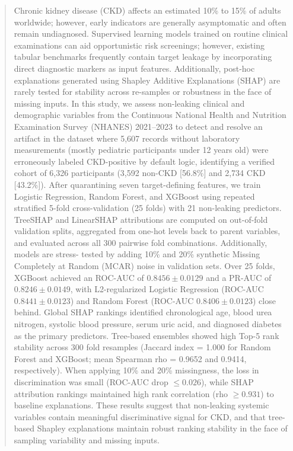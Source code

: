 \documentclass[runningheads]{llncs}
\begin{document}
\begin{abstract}
Chronic kidney disease (CKD) affects an estimated 10\% to 15\% of adults worldwide; however, early indicators are generally asymptomatic and often remain undiagnosed. Supervised learning models trained on routine clinical examinations can aid opportunistic risk screenings; however, existing tabular benchmarks frequently contain target leakage by incorporating direct diagnostic markers as input features. Additionally, post-hoc explanations generated using Shapley Additive Explanations (SHAP) are rarely tested for stability across re-samples or robustness in the face of missing inputs. In this study, we assess non-leaking clinical and demographic variables from the Continuous National Health and Nutrition Examination Survey (NHANES) 2021--2023 to detect and resolve an artifact in the dataset where 5,607 records without laboratory measurements (mostly pediatric participants under 12 years old) were erroneously labeled CKD-positive by default logic, identifying a verified cohort of 6,326 participants (3,592 non-CKD [56.8\%] and 2,734 CKD [43.2\%]). After quarantining seven target-defining features, we train Logistic Regression, Random Forest, and XGBoost using repeated stratified 5-fold cross-validation (25 folds) with 21 non-leaking predictors. TreeSHAP and LinearSHAP attributions are computed on out-of-fold validation splits, aggregated from one-hot levels back to parent variables, and evaluated across all 300 pairwise fold combinations. Additionally, models are stress- tested by adding 10\% and 20\% synthetic Missing Completely at Random (MCAR) noise in validation sets. Over 25 folds, XGBoost achieved an ROC-AUC of $0.8456 \pm 0.0129$ and a PR-AUC of $0.8246 \pm 0.0149$, with L2-regularized Logistic Regression (ROC-AUC $0.8441 \pm 0.0123$) and Random Forest (ROC-AUC $0.8406 \pm 0.0123$) close behind. Global SHAP rankings identified chronological age, blood urea nitrogen, systolic blood pressure, serum uric acid, and diagnosed diabetes as the primary predictors. Tree-based ensembles showed high Top-5 rank stability across 300 fold resamples (Jaccard index = 1.000 for Random Forest and XGBoost; mean Spearman rho = 0.9652 and 0.9414, respectively). When applying 10\% and 20\% missingness, the loss in discrimination was small (ROC-AUC drop $\le 0.026$), while SHAP attribution rankings maintained high rank correlation (rho $\ge 0.931$) to baseline explanations. These results suggest that non-leaking systemic variables contain meaningful discriminative signal for CKD, and that tree-based Shapley explanations maintain robust ranking stability in the face of sampling variability and missing inputs.

\end{abstract}
\end{document}
